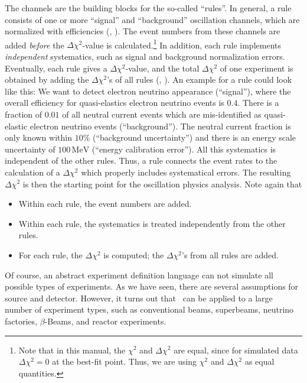 The channels are the building blocks for the so-called ``rules''.
 In general, a rule consists of one or more ``signal'' and ``background'' oscillation channels, which are normalized with efficiencies
(\cf, ). The event numbers from these channels are added {\em before} the $\Delta \chi^2$-value is calculated.\footnote{Note that
in this manual, the $\chi^2$ and $\Delta \chi^2$ are equal, since
for simulated data $\Delta \chi^2 = 0$ at the best-fit point. Thus, we
are using $\chi^2$ and $\Delta \chi^2$ as equal quantities.} In addition, each rule implements {\em independent} systematics, such as signal and background normalization errors. Eventually, each rule gives a $\Delta \chi^2$-value, and the total $\Delta \chi^2$ of one experiment is obtained by adding the $\Delta \chi^2$'s of all rules (\cf, ). 
 An example for a rule could look like this: We want to detect electron
  neutrino appearance (``signal''), where the overall efficiency for 
  quasi-elastics electron neutrino events is $0.4$. There is a fraction of 
  $0.01$ of all neutral current events which are mis-identified as 
  quasi-elastic electron neutrino events (``background''). The neutral 
  current fraction is only known within $10\%$ (``background uncertainty'') 
  and there is
an energy scale uncertainty of $100\,\mathrm{MeV}$ (``energy calibration error'').
All this systematics is independent of the other rules.  Thus, a rule connects the event rates to the calculation of a $\Delta \chi^2$ which properly includes systematical errors. The resulting $\Delta \chi^2$ is then the starting point for the oscillation physics analysis. Note again that
\begin{itemize}
\item
 Within each rule, the event numbers are added.
\item
 Within each rule, the systematics is treated independently from the other rules.
\item
 For each rule, the $\Delta \chi^2$ is computed; the $\Delta \chi^2$'s from all rules are added.
\end{itemize}

Of course, an abstract experiment definition language can not simulate all possible types of experiments. As we have seen, there are several assumptions for source and detector. However, it turns out that \GLOBES\ can be applied to a large number of experiment types, such as conventional beams, superbeams, neutrino factories, $\beta$-Beams, and reactor experiments.

